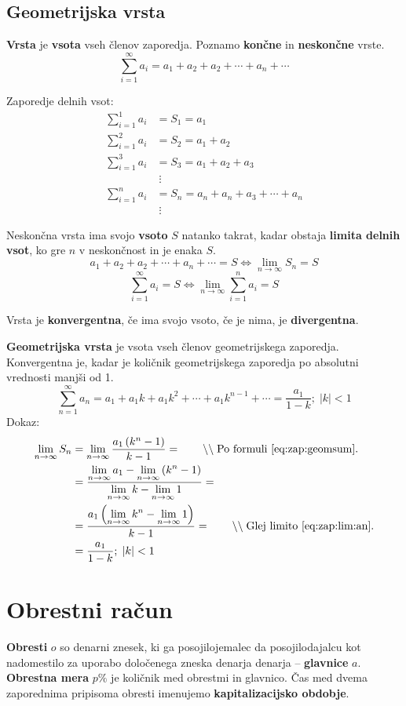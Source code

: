 \documentclass[a4paper,oneside,12pt,fleqn]{article}
\newcommand{\comment}[1]{\ensuremath{\qquad\backslash\backslash\;}\textnormal{#1}}
\def\limi{\displaystyle\lim_{n\to\infty}} %
\def\sumi{\displaystyle\sum^{\infty}} %
\renewcommand\iff\Leftrightarrow
\numberwithin{equation}{section}
\begin{document}
\subsection{Geometrijska vrsta}
\label{sec:zap:geovrst}
\textbf{Vrsta} je \textbf{vsota} vseh členov zaporedja. Poznamo \textbf{končne} in
\textbf{neskončne} vrste. 
\[ \sumi_{i=1} a_i = a_1 + a_2 + a_2 + \cdots + a_n + \cdots \]

Zaporedje delnih vsot:
\begin{align*}
  \sum^1_{i=1} a_i &= S_1 = a_1 \\
  \sum^2_{i=1} a_i &= S_2 = a_1 + a_2 \\
  \sum^3_{i=1} a_i &= S_3 = a_1 + a_2 + a_3 \\[-10pt]
  & \; \vdots \\[-10pt]
  \sum^n_{i=1} a_i &= S_n = a_n + a_n + a_3 + \cdots + a_n \\[-10pt]
  & \; \vdots
\end{align*}

Neskončna vrsta ima svojo \textbf{vsoto} $S$ natanko takrat, kadar obstaja \textbf{limita
delnih vsot}, ko gre
$n$ v neskončnost in je enaka $S$.
\[ a_1 + a_2 + a_2 + \cdots + a_n + \cdots = S \iff \limi S_n = S \]
\[ \sumi_{i=1} a_i = S \iff \limi{ \sum^n_{i=1}a_i} = S \]

Vrsta je \textbf{konvergentna}, če ima svojo vsoto, če je nima, je \textbf{divergentna}.

\textbf{Geometrijska vrsta} je vsota vseh členov geometrijskega zaporedja. Konvergentna
je, kadar je količnik geometrijskega zaporedja po absolutni vrednosti manjši od 1. 
\[ \sumi_{n=1}a_n = a_1 + a_1k + a_1k^2 + \cdots + a_1k^{n-1} + \cdots = \frac{a_1}{1-k};
\;  \left|k\right| < 1 \]
Dokaz:
\begin{align*}
   \limi S_n &= \limi \frac{a_1 \left( k^n - 1 \right)}{k-1} = \comment{Po formuli
  \eqref{eq:zap:geomsum}.} \\
  & = \frac{\limi a_1 - \limi \left( k^n-1 \right)}{\limi k - \limi1} = \\
  & = \frac{a_1 \left(\limi k^n - \limi 1 \right)}{k-1} = \comment{Glej limito~\eqref{eq:zap:lim:an}.} \\
  & = \frac{a_1}{1-k}; \; \left|k\right|<1
\end{align*}

\section{Obrestni račun}
\label{sec:obrest}
\textbf{Obresti} $o$ so denarni znesek, ki ga posojilojemalec da posojilodajalcu kot nadomestilo za
uporabo določenega zneska denarja denarja -- \textbf{glavnice} $a$. \textbf{Obrestna mera} $p\%$ je količnik
med obrestmi in glavnico. Čas med dvema zaporednima pripisoma obresti imenujemo
\textbf{kapitalizacijsko obdobje}.
\end{document}
